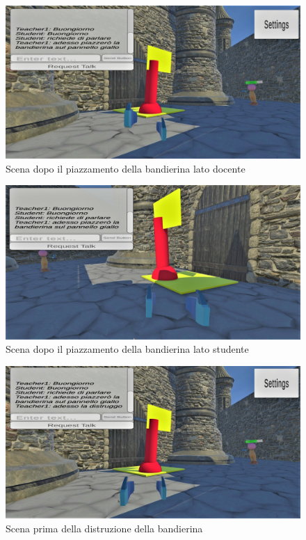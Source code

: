 \begin{figure}[H]
\centering
\includegraphics[scale = 0.25]{Immagini/Dimostrazioni d'uso/bandierinapiazzatalatodocente.jpg}
\caption{Scena dopo il piazzamento della bandierina lato docente}
\end{figure}\begin{figure}[H]
\centering
\includegraphics[scale = 0.25]{Immagini/Dimostrazioni d'uso/bandierinapiazzatalatostudente.jpg}
\caption{Scena dopo il piazzamento della bandierina lato studente}
\end{figure}
\begin{figure}[H]
\centering
\includegraphics[scale = 0.25]{Immagini/Dimostrazioni d'uso/adessoladistruggo.jpg}
\caption{Scena prima della distruzione della bandierina}
\end{figure}
